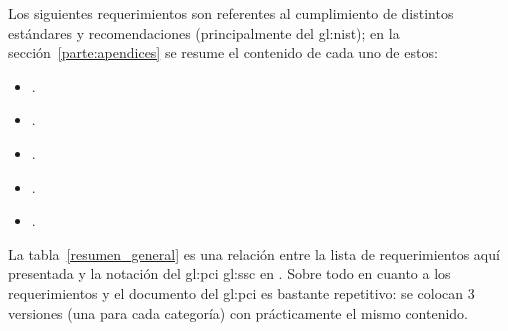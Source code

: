 Los siguientes requerimientos son referentes al cumplimiento
de distintos estándares y recomendaciones (principalmente del \gls{gl:nist});
en la sección~\ref{parte:apendices} se resume el contenido de cada uno de
estos:

\begin{itemize}
  \item {}.
  \item {}.
  \item {}.
  \item {}.
  \item {}.
\end{itemize}

La tabla~\ref{resumen_general} es una relación entre la lista de
requerimientos aquí presentada y la notación del \gls{gl:pci} \gls{gl:ssc} en
\cite{pci_tokens}. Sobre todo en cuanto a los requerimientos
 y
 el documento del \gls{gl:pci} es
bastante repetitivo: se colocan 3 versiones (una para cada categoría) con
prácticamente el mismo contenido.

